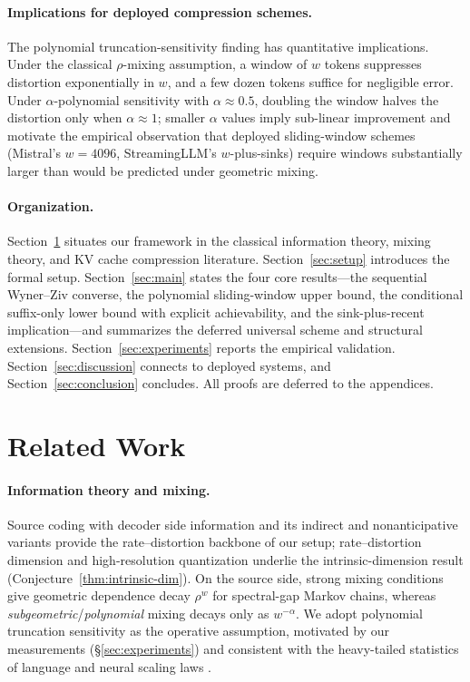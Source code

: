 \documentclass[11pt]{article}
\theoremstyle{plain}
\theoremstyle{definition}
\theoremstyle{remark}
\begin{document}
\paragraph{Implications for deployed compression schemes.}
The polynomial truncation-sensitivity finding has quantitative
implications. Under the classical $\rho$-mixing assumption, a
window of $w$ tokens suppresses distortion exponentially in $w$,
and a few dozen tokens suffice for negligible error. Under
$\alpha$-polynomial sensitivity with $\alpha \approx 0.5$, doubling
the window halves the distortion only when $\alpha \approx 1$;
smaller $\alpha$ values imply sub-linear improvement and motivate
the empirical observation that deployed sliding-window schemes
(Mistral's $w = 4096$, StreamingLLM's $w$-plus-sinks) require
windows substantially larger than would be predicted under
geometric mixing.

\paragraph{Organization.}
Section~\ref{sec:related} situates our framework in the classical
information theory, mixing theory, and KV cache compression
literature. Section~\ref{sec:setup} introduces the formal setup.
Section~\ref{sec:main} states the four core results---the
sequential Wyner--Ziv converse, the polynomial sliding-window
upper bound, the conditional suffix-only lower bound with explicit
achievability, and the sink-plus-recent implication---and summarizes
the deferred universal scheme and structural extensions.
Section~\ref{sec:experiments} reports the empirical validation.
Section~\ref{sec:discussion} connects to deployed systems, and
Section~\ref{sec:conclusion} concludes. All proofs are deferred to
the appendices.

\section{Related Work}
\label{sec:related}

\paragraph{Information theory and mixing.}
Source coding with decoder side information \citep{wyner1976rate} and
its indirect \citep{witsenhausen1980indirect} and nonanticipative
\citep{massey1990causality,charalambous2013nonanticipative} variants
provide the rate--distortion backbone of our setup; rate--distortion
dimension \citep{kawabata1994rate} and high-resolution quantization
\citep{bennett1948spectra,gersho1979asymptotically} underlie the
intrinsic-dimension result (Conjecture~\ref{thm:intrinsic-dim}). On the
source side, strong mixing conditions \citep{bradley2005basic} give
geometric dependence decay $\rho^w$ for spectral-gap Markov chains,
whereas \emph{subgeometric}/\emph{polynomial} mixing
\citep{douc2009subgeometric} decays only as $w^{-\alpha}$. We adopt
polynomial truncation sensitivity as the operative assumption,
motivated by our measurements (\S\ref{sec:experiments}) and
consistent with the heavy-tailed statistics of language
\citep{piantadosi2014zipf} and neural scaling laws
\citep{kaplan2020scaling}.
\end{document}
